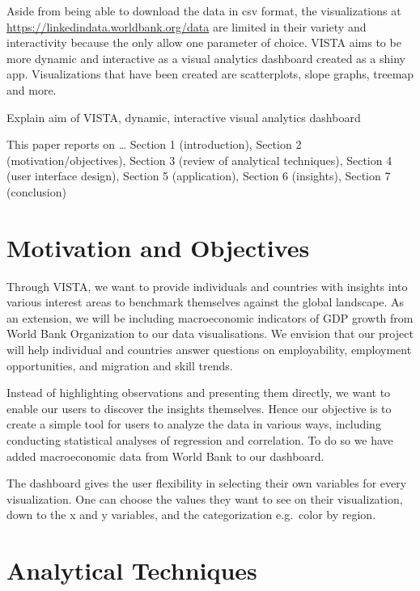 \documentclass{acm_proc_article-sp}
\begin{document}
Aside from being able to download the data in csv format, the
visualizations at \url{https://linkedindata.worldbank.org/data} are
limited in their variety and interactivity because the only allow one
parameter of choice. VISTA aims to be more dynamic and interactive as a
visual analytics dashboard created as a shiny app. Visualizations that
have been created are scatterplots, slope graphs, treemap and more.

Explain aim of VISTA, dynamic, interactive visual analytics dashboard

This paper reports on \ldots{} Section 1 (introduction), Section 2
(motivation/objectives), Section 3 (review of analytical techniques),
Section 4 (user interface design), Section 5 (application), Section 6
(insights), Section 7 (conclusion)

\hypertarget{motivation-and-objectives}{%
\section{Motivation and Objectives}\label{motivation-and-objectives}}

Through VISTA, we want to provide individuals and countries with
insights into various interest areas to benchmark themselves against the
global landscape. As an extension, we will be including macroeconomic
indicators of GDP growth from World Bank Organization to our data
visualisations. We envision that our project will help individual and
countries answer questions on employability, employment opportunities,
and migration and skill trends.

Instead of highlighting observations and presenting them directly, we
want to enable our users to discover the insights themselves. Hence our
objective is to create a simple tool for users to analyze the data in
various ways, including conducting statistical analyses of regression
and correlation. To do so we have added macroeconomic data from World
Bank to our dashboard.

The dashboard gives the user flexibility in selecting their own
variables for every visualization. One can choose the values they want
to see on their visualization, down to the x and y variables, and the
categorization e.g.~color by region.

\hypertarget{analytical-techniques}{%
\section{Analytical Techniques}\label{analytical-techniques}}
\end{document}
